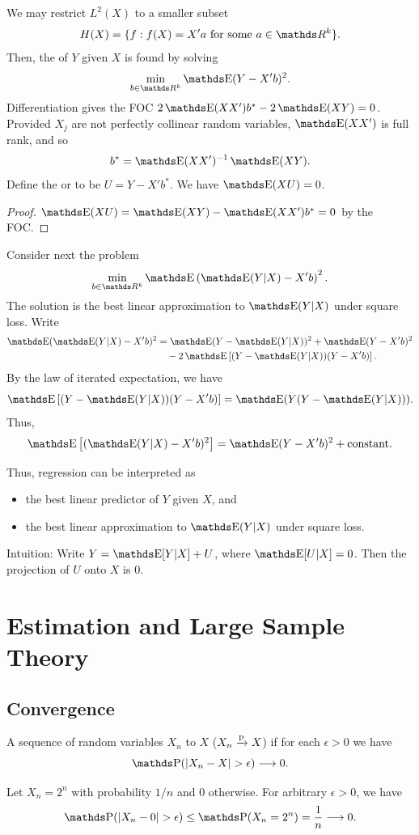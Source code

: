 \documentclass[letterpaper, 10pt]{article}
\begin{document}
We may restrict \(L^2(X)\) to a smaller subset
\[
  H(X) = \{f: f(X) = X'a \text{ for some } a \in \RR^k\}.
\]
Then, the  of \(Y\) given \(X\) is found by solving
\[
  \min_{b \in \RR^k} \E(Y - X' b)^2.
\]
Differentiation gives the FOC \(2\E(XX') b^* - 2\E(XY) = 0\).
Provided \(X_j\) are not perfectly collinear random variables, \(\E(XX')\) is full rank, and so
\[
  b^* = \E(XX')^{-1} \E(XY).
\]
Define the  or  to be \(U = Y - X' b^*\).
We have \(\E(XU) = 0\).
\begin{proof}
  \(\E(XU) = \E(XY) - \E(XX') b^* = 0\) by the FOC.
\end{proof}

Consider next the problem
\[
  \min_{b \in \RR^k} \E\left( \E(Y|X) - X'b \right)^2.
\]
The solution is the best linear approximation to \(\E(Y|X)\) under square loss.
Write
\begin{align*}
  \E (\E(Y|X) - X'b)^2
  &= \E(Y - \E(Y|X))^2 + \E(Y - X'b)^2 \\
  &\quad- 2 \E\left[ (Y - \E(Y|X)) (Y - X'b) \right].
\end{align*}
By the law of iterated expectation, we have
\[
  \E\left[ (Y - \E(Y|X)) (Y - X'b) \right]
  = \E(Y(Y - \E(Y|X))).
\]
Thus,
\[
  \E\left[ (\E(Y|X) - X'b)^2 \right]
  = \E(Y - X'b)^2 + \text{constant}.
\]

\begin{remark}
  Thus, regression can be interpreted as
  \begin{itemize}
    \item the best linear predictor of \(Y\) given \(X\), and
    \item the best linear approximation to \(\E(Y|X)\) under square loss.
  \end{itemize}
  Intuition:
  Write \(Y = \E[Y|X] + U\), where \(\E[U|X] = 0\).
  Then the projection of \(U\) onto \(X\) is \(0\).
\end{remark}



\section{Estimation and Large Sample Theory}
\subsection{Convergence}
\begin{definition}
  A sequence of random variables \(X_n\)  to \(X\) (\(X_n \xrightarrow{\mathrm{p}} X\)) if for each \(\epsilon > 0\) we have
  \[
    \P(\abs{X_n - X} > \epsilon) \longrightarrow 0.
  \]
\end{definition}
\begin{example}
  Let \(X_n = 2^n\) with probability \(1 / n\) and \(0\) otherwise.
  For arbitrary \(\epsilon > 0\), we have
  \[
    \P(\abs{X_n - 0} > \epsilon) \leq \P(X_n = 2^n) = \frac{1}{n} \longrightarrow 0.
  \]
\end{example}
\end{document}
